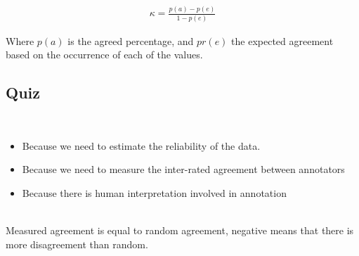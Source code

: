 \begin{definition}
  \begin{align*}
    \kappa = \frac{p(a) - p(e)}{1 - p(e)}
  \end{align*}

  Where $p(a)$ is the agreed percentage, and $pr(e)$ the expected agreement
  based on the occurrence of each of the values.
\end{definition}

\subsection{Quiz}

\begin{quiz}
  ~\\
  \begin{itemize}
    \item Because we need to estimate the reliability of the data.
    \item Because we need to measure the inter-rated agreement
      between annotators
    \item Because there is human interpretation involved in annotation
  \end{itemize}
\end{quiz}

\begin{quiz}[What is the interpretation of Kappa = 0]
  ~\\
  Measured agreement is equal to random agreement, negative means
  that there is more
  disagreement than random.
\end{quiz}

